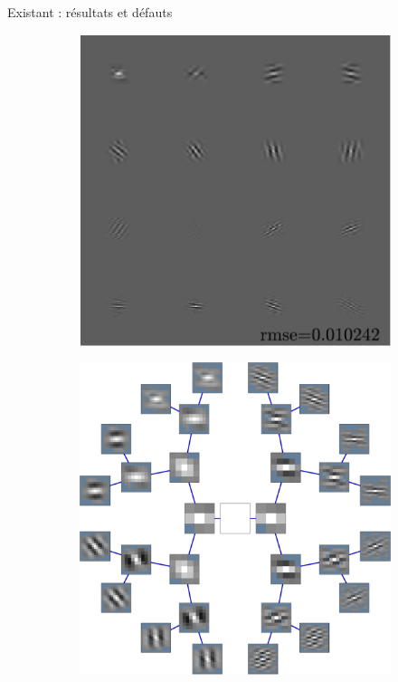 \begin{frame}{Existant : résultats et défauts}
\begin{figure} \centering
\begin{subfigure}[b]{0.30\textwidth}\centering
	\includegraphics[width=\textwidth]{figures-masters-thesis/tree-learn-setup/xp_learnsupp256_curvelet_decomp3[tree-binary_dpth4]_supp-generic3x3_[fixed-supports]_approx.pdf}
\end{subfigure}
\begin{subfigure}[b]{0.30\textwidth}\centering
	\includegraphics[width=\textwidth]{figures-masters-thesis/tree-learn-setup/xp_learnsupp256_curvelet_decomp3[tree-binary_dpth4]_supp-generic3x3_[fixed-supports]_mothertree.pdf}
\end{subfigure}
\end{figure}
\end{frame}


